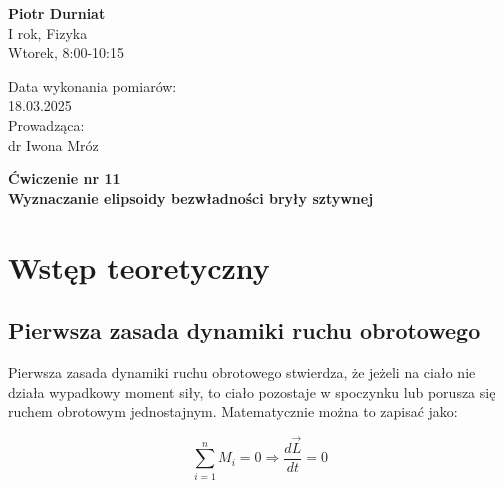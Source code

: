 \documentclass[a4paper,12pt]{article}
\begin{document}
\noindent
\begin{minipage}{0.5\textwidth}
    \raggedright
    \textbf{Piotr Durniat} \\
    I rok, Fizyka \\
    Wtorek, 8:00-10:15 \\
    \vspace{0.5cm}
    \vspace{0.5cm}
\end{minipage}%
\begin{minipage}{0.5\textwidth}
    \raggedleft
    Data wykonania pomiarów: \\
    18.03.2025 \\
    \vspace{0.5cm}
    Prowadząca: \\
    dr Iwona Mróz
\end{minipage}


\vspace{2cm}
\begin{center}
    \LARGE \textbf{Ćwiczenie nr 11} \\[0.5cm]
    \Large \textbf{Wyznaczanie elipsoidy bezwładności bryły sztywnej}
\end{center}

\vspace{1cm}
\noindent

\tableofcontents
\newpage



\section{Wstęp teoretyczny}

\subsection*{Pierwsza zasada dynamiki ruchu obrotowego}

Pierwsza zasada dynamiki ruchu obrotowego stwierdza, że jeżeli na ciało nie działa wypadkowy moment siły, to ciało pozostaje w spoczynku lub porusza się ruchem obrotowym jednostajnym. Matematycznie można to zapisać jako:

\begin{equation*}
    \sum_{i=1}^{n} M_i = 0
    \Rightarrow
    \frac{d\vec{L}}{dt} = 0
\end{equation*}
\end{document}
